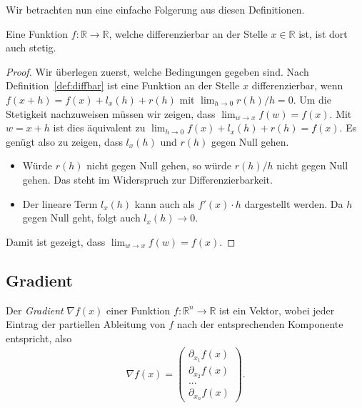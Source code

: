 Wir betrachten nun eine einfache Folgerung aus diesen Definitionen.

\begin{Lem}
Eine Funktion $f:\mathbb{R} \rightarrow \mathbb{R}$, welche differenzierbar an der Stelle $x \in \mathbb{R}$ ist, ist dort auch stetig.
\end{Lem}

\begin{proof}
Wir überlegen zuerst, welche Bedingungen gegeben sind. Nach Definition~\ref{def:diffbar} ist eine Funktion an der Stelle $x$ differenzierbar, wenn $f(x+h)=f(x)+l_x(h)+ r(h)$  mit $\lim_{h \rightarrow 0} r(h)/h= 0$. Um die Stetigkeit nachzuweisen müssen wir zeigen, dass $\lim_{w \rightarrow x} f(w)=f(x)$. Mit $w = x+h$ ist dies äquivalent zu $\lim_{h \rightarrow 0} f(x)+l_x(h)+r(h)=f(x)$. Es genügt also zu zeigen, dass  $l_x(h)$ und $r(h)$ gegen Null gehen.
\begin{itemize}
  \item Würde $r(h)$ nicht gegen Null gehen, so würde $r(h)/h$ nicht gegen Null gehen. Das steht im Widerspruch zur Differenzierbarkeit.
  \item Der lineare Term $l_x(h)$ kann auch als $f'(x) \cdot h$ dargestellt werden. Da $h$ gegen Null geht, folgt auch $l_x(h)\rightarrow 0$.
\end{itemize}
Damit ist gezeigt, dass $\lim_{w\rightarrow x} f(w) = f(x)$.
\end{proof}

\subsection{Gradient}
\label{sec:gradient}
\begin{Def}
Der \emph{Gradient} $\nabla f(x)$ einer Funktion $f:\mathbb{R}^n\rightarrow \mathbb{R}$ ist ein Vektor, wobei jeder Eintrag der partiellen Ableitung von $f$ nach der entsprechenden Komponente entspricht, also
\begin{equation*} \begin{split} \nabla f(x) = \left( \begin{array}{c}
\partial_{x_1} f(x) \\
\partial_{x_2} f(x) \\
... \\
\partial_{x_n} f(x)
\end{array}
\right).
\end{split} \end{equation*} 
\end{Def}

